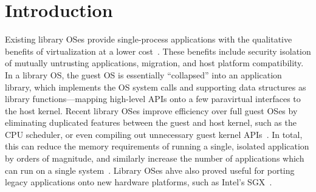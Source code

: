 \section{Introduction}
\label{sec:intro}
Existing library OSes provide single-process applications
with the qualitative benefits of virtualization
at a lower cost~\cite{porter11drawbridge,unikernels,baumann13bascule}.
These benefits include security isolation of mutually untrusting applications,
migration, and host platform compatibility.
In a library OS, the guest OS is essentially ``collapsed''
into an application library,
which implements the OS system calls and supporting data structures as library functions---mapping
high-level APIs onto
a few paravirtual interfaces to the host kernel.
Recent library OSes improve efficiency over full guest OSes by eliminating duplicated features
between the guest and host kernel,
such as the CPU scheduler, or
even compiling out unnecessary guest kernel APIs~\cite{unikernels}.
In total, this can reduce the memory requirements of running a single, isolated application
by orders of magnitude, and similarly
increase the number of applications which can run
on a single system~\cite{porter11drawbridge,unikernels}.
Library OSes ahve also proved
useful for porting legacy applications
onto new hardware platforms, such as Intel's SGX~\cite{baumann14haven}.



